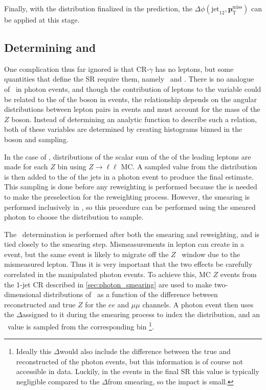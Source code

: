 Finally, with the \met distribution finalized in the \gjets prediction, the $\Delta\phi(\text{jet}_{12},{\boldsymbol p}_{\mathrm{T}}^\mathrm{miss})$ can be applied at this stage. 


\subsection{Determining \HT and \mll}
\label{sec:photon_mll}

One complication thus far ignored is that CR-$\gamma$ has no leptons, but some quantities that define the \ac{SR} require them, namely \mll~and \HT. There is no analogue of \mll~in photon events, and though the contribution of leptons to the \HT variable could be related to the \pt of the boson in \gjets events, the relationship depends on the angular distributions between lepton pairs in \dyjets events and must account for the mass of the $Z$ boson. Instead of determining an analytic function to describe such a relation, both of these variables are determined by creating histograms binned in the boson \pt and sampling. 

In the case of \HT, distributions of the scalar sum of the \pt of the leading leptons are made for each $Z$ \pt bin using $Z\rightarrow \ell \ell$ \ac{MC}. A sampled value from the distribution is then added to the \HT of the jets in a photon event to produce the final estimate. This sampling is done before any reweighting is performed because the \HT is needed to make the preselection for the reweighting process. However, the smearing is performed inclusively in \HT, so this procedure can be performed using the smeared photon \pt to choose the distribution to sample. 

The \mll~determination is performed after both the smearing and reweighting, and is tied closely to the smearing step. Mismeasurements in lepton \pt can create \met in a \dyjets event, but the same event is likely to migrate off the $Z$ \mll~window due to the mismeasured lepton. Thus it is very important that the two effects be carefully correlated in the manipulated photon events. To achieve this, \ac{MC} $Z$ events from the 1-jet \ac{CR} described in \autoref{sec:photon_smearing} are used to make two-dimensional distributions of \mll~as a function of the difference between reconstructed and true $Z$ \pt for the $ee$ and $\mu\mu$ channels. A photon event then uses the $\Delta$\pt assigned to it during the smearing process to index the distribution, and an \mll~value is sampled from the corresponding bin \footnote{Ideally this $\Delta$\pt would also include the difference between the true and reconstructed \pt of the photon events, but this information is of course not accessible in data. Luckily, in the events in the final \ac{SR} this value is typically negligible compared to the $\Delta$\pt from smearing, so the impact is small.}. 

